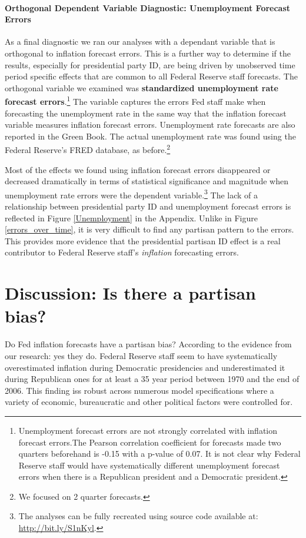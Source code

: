 \documentclass[a4paper]{article}\usepackage{graphicx, color}
\begin{document}
\paragraph{Orthogonal Dependent Variable Diagnostic: Unemployment Forecast Errors}

As a final diagnostic we ran our analyses with a dependant variable that is orthogonal to inflation forecast errors. This is a further way to determine if the results, especially for presidential party ID, are being driven by unobserved time period specific effects that are common to all Federal Reserve staff forecasts. The orthogonal variable we examined was {\bf{standardized unemployment rate forecast errors}}.\footnote{Unemployment forecast errors are not strongly correlated with inflation forecast errors.The Pearson correlation coefficient for forecasts made two quarters beforehand is -0.15 with a p-value of 0.07. It is not clear why Federal Reserve staff would have systematically different unemployment forecast errors when there is a Republican president and a Democratic president.} The variable captures the errors Fed staff make when forecasting the unemployment rate in the same way that the inflation forecast variable measures inflation forecast errors. Unemployment rate forecasts are also reported in the Green Book. The actual unemployment rate was found using the Federal Reserve's FRED database, as before.\footnote{We focused on 2 quarter forecasts.}

Most of the effects we found using inflation forecast errors disappeared or decreased dramatically in terms of statistical significance and magnitude when unemployment rate errors were the dependent variable.\footnote{The analyses can be fully recreated using source code available at: \url{http://bit.ly/S1nKyl}.} The lack of a relationship between presidential party ID and unemployment forecast errors is reflected in Figure \ref{Unemployment} in the Appendix. Unlike in Figure \ref{errors_over_time}, it is very difficult to find any partisan pattern to the errors. This provides more evidence that the presidential partisan ID effect is a real contributor to Federal Reserve staff's \emph{inflation} forecasting errors.

\section*{Discussion: Is there a partisan bias?}

Do Fed inflation forecasts have a partisan bias? According to the evidence from our research: yes they do. Federal Reserve staff seem to have systematically overestimated inflation during Democratic presidencies and underestimated it during Republican ones for at least a 35 year period between 1970 and the end of 2006. This finding iss robust across numerous model specifications where a variety of economic, bureaucratic and other political factors were controlled for. 
\end{document}
